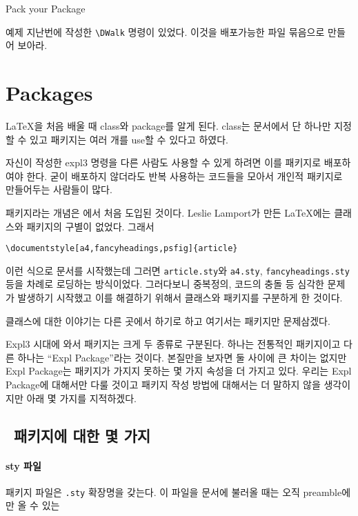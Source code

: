 \documentclass[a4paper,amsmath]{oblivoir}
\newcounter{sub}
\begin{document}
\begin{intro}[9]
Pack your Package
\end{intro}

\begin{questiona}{예제}
지난번에 작성한 \verb|\DWalk| 명령이 있었다. 이것을 배포가능한
파일 묶음으로 만들어 보아라.
\end{questiona}

\section{Packages}

\LaTeX 을 처음 배울 때 class와 package를 알게 된다. class는 문서에서 단 하나만 지정할
수 있고 패키지는 여러 개를 use할 수 있다고 하였다.

자신이 작성한 expl3 명령을 다른 사람도 사용할 수 있게 하려면 이를 패키지로 배포하여야 한다.
굳이 배포하지 않더라도 반복 사용하는 코드들을 모아서 개인적 패키지로 만들어두는 사람들이 많다.

패키지라는 개념은 \LaTeXe 에서 처음 도입된 것이다. 
Leslie Lamport가 만든 \LaTeX 에는 클래스와 패키지의 구별이 없었다. 그래서

\begin{verbatim}
\documentstyle[a4,fancyheadings,psfig]{article}
\end{verbatim}

이런 식으로 문서를 시작했는데 그러면 \verb|article.sty|와 \verb|a4.sty|, \verb|fancyheadings.sty| 등을 차례로 로딩하는 방식이었다.
그러다보니 중복정의, 코드의 충돌 등 심각한 문제가 발생하기 시작했고 이를 해결하기 위해서
클래스와 패키지를 구분하게 한 것이다.

클래스에 대한 이야기는 다른 곳에서 하기로 하고 여기서는 패키지만 문제삼겠다.

Expl3 시대에 와서 패키지는 크게 두 종류로 구분된다. 하나는 전통적인 \LaTeXe{} 패키지이고
다른 하나는 “Expl Package”라는 것이다. 본질만을 보자면 둘 사이에 큰 차이는 없지만
Expl Package는 \LaTeXe{} 패키지가 가지지 못하는 몇 가지 속성을 더 가지고 있다.
우리는 Expl Package에 대해서만 다룰 것이고 \LaTeXe{} 패키지 작성 방법에 대해서는 
더 말하지 않을 생각이지만 아래 몇 가지를 지적하겠다.

\subsection{\LaTeXe\ 패키지에 대한 몇 가지}

\paragraph{sty 파일}
패키지 파일은 \verb|.sty| 확장명을 갖는다. 이 파일을 문서에 불러올 때는 오직 preamble에만
올 수 있는
\end{document}

